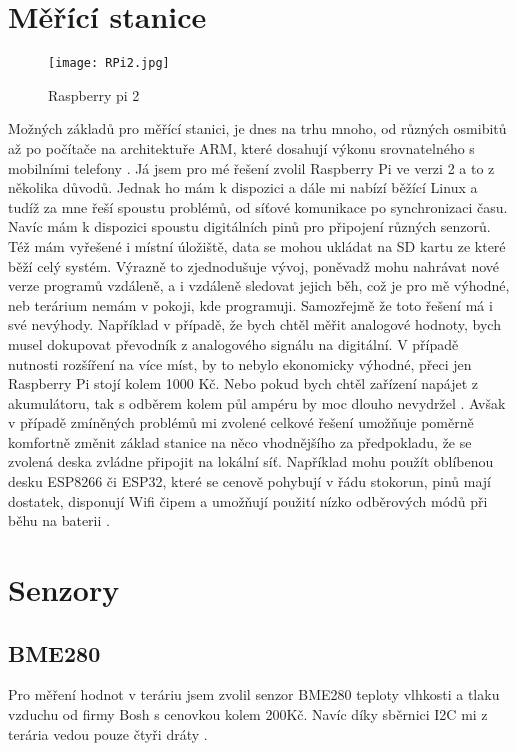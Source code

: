 
\section{Měřící stanice}
\begin{figure}[H]
    \centering
    \texttt{[image: RPi2.jpg]}
    \caption{Raspberry pi 2}
\end{figure}
Možných základů pro měřící stanici, je dnes na trhu mnoho, od různých osmibitů až po počítače na architektuře ARM,  
které dosahují výkonu srovnatelného s mobilními telefony \parencite{wiki:raspberrypi}. Já jsem pro mé řešení zvolil 
Raspberry Pi ve verzi 2 a to z několika důvodů. Jednak ho mám k dispozici a dále mi nabízí běžící Linux a tudíž za mne 
řeší spoustu problémů, od síťové komunikace po synchronizaci času. Navíc mám k dispozici spoustu digitálních pinů pro 
připojení různých senzorů. Též mám vyřešené i místní úložiště, data se mohou ukládat na SD kartu ze které běží celý 
systém. Výrazně to zjednodušuje vývoj, poněvadž mohu nahrávat nové verze programů vzdáleně, a i vzdáleně sledovat jejich 
běh, což je pro mě výhodné, neb terárium nemám v pokoji, kde programuji. Samozřejmě že toto řešení má i své nevýhody. 
Například v případě, že bych chtěl měřit analogové hodnoty, bych musel dokupovat převodník z analogového signálu na 
digitální. V případě nutnosti rozšíření na více míst, by to nebylo ekonomicky výhodné, přeci jen Raspberry Pi stojí 
kolem 1000 Kč. Nebo pokud bych chtěl zařízení napájet z akumulátoru, tak s odběrem kolem půl ampéru by moc dlouho 
nevydržel \parencite{wiki:raspberrypi}. Avšak v případě zmíněných problémů mi zvolené celkové řešení umožňuje poměrně 
komfortně změnit základ stanice na něco vhodnějšího za předpokladu, že se zvolená deska zvládne připojit na lokální síť. 
Například mohu použít oblíbenou desku ESP8266 či ESP32, které se cenově pohybují v řádu stokorun, pinů mají dostatek, 
disponují Wifi čipem a umožňují použití nízko odběrových módů při běhu na baterii \parencite{root.cz:ESP}.

\section{Senzory}
\subsection{BME280}
Pro měření hodnot v teráriu jsem zvolil senzor BME280 teploty vlhkosti a tlaku vzduchu od firmy Bosh s cenovkou kolem 
200Kč. Navíc díky sběrnici \gls{I2C} mi z terária vedou pouze čtyři dráty \parencite{pajenicko:BME280}.

